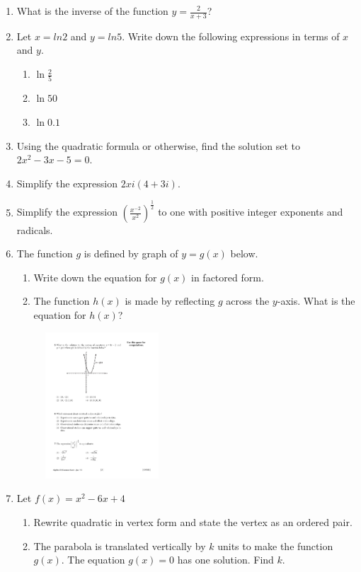 \documentclass[12pt, oneside]{article}
\begin{document}
\begin{enumerate}
\item What is the inverse of the function $y=\frac{2}{x+3}$?

\item Let $x=ln2$ and $y=ln5$. Write down the following expressions in terms of $x$ and $y$.
\begin{enumerate}
    \item $\ln \frac{2}{5}$
    \item $\ln 50$
    \item $\ln 0.1$
\end{enumerate}

\item Using the quadratic formula or otherwise, find the solution set to $2x^2-3x-5=0$.

\item Simplify the expression $2xi(4+3i)$.

\item Simplify the expression $\displaystyle \left( \frac{x^{-2}}{x^2} \right)^{\frac{1}{2}}$ to one with positive integer exponents and radicals.

\newpage
\item The function $g$ is defined by graph of $y=g(x)$ below.
\begin{enumerate}
    \item Write down the equation for $g(x)$ in factored form.
    \item The function $h(x)$ is made by reflecting $g$ across the $y$-axis. What is the equation for $h(x)$?
\end{enumerate}

\begin{figure}[!ht]
    \centering
    \includegraphics[width=0.4\textwidth]{parabola-graphic.pdf}
\end{figure}

\item Let $f(x) = x^2-6x+4$
\begin{enumerate}
    \item Rewrite quadratic in vertex form and state the vertex as an ordered pair.
    \item The parabola is translated vertically by $k$ units to make the function $g(x)$. The equation $g(x)=0$ has one solution. Find $k$.
\end{enumerate}


\end{enumerate}
\end{document}
